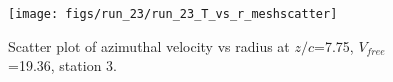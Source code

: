 \begin{figure}[H]
\centering
\texttt{[image: figs/run\_23/run\_23\_T\_vs\_r\_meshscatter]}
\caption{Scatter plot of azimuthal velocity vs radius at $z/c$=7.75, $V_{free}$=19.36, station 3.}
\label{fig:run_23_T_vs_r_meshscatter}
\end{figure}


